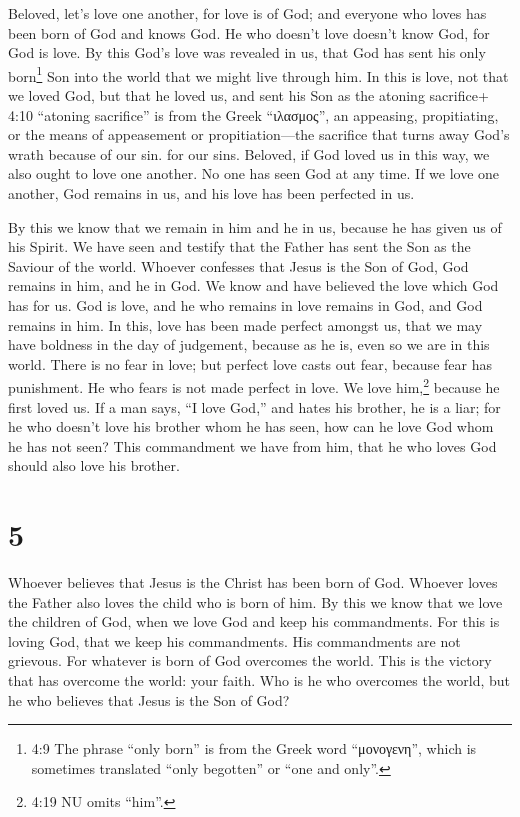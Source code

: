  Beloved, let's love one another, for love is of God; and
everyone who loves has been born of God and knows God.  He
who doesn't love doesn't know God, for God is love.  By this
God's love was revealed in us, that God has sent his only
born\footnote{4:9 The phrase ``only born'' is from the Greek word
  ``μονογενη'', which is sometimes translated ``only begotten'' or ``one
  and only''.} Son into the world that we might live through him.
 In this is love, not that we loved God, but that he loved
us, and sent his Son as the atoning sacrifice+ 4:10 ``atoning
sacrifice'' is from the Greek ``ιλασμος'', an appeasing, propitiating,
or the means of appeasement or propitiation---the sacrifice that turns
away God's wrath because of our sin. for our sins. 
Beloved, if God loved us in this way, we also ought to love one another.
 No one has seen God at any time. If we love one another,
God remains in us, and his love has been perfected in us.

 By this we know that we remain in him and he in us,
because he has given us of his Spirit.  We have seen and
testify that the Father has sent the Son as the Saviour of the world.
 Whoever confesses that Jesus is the Son of God, God
remains in him, and he in God.  We know and have believed
the love which God has for us. God is love, and he who remains in love
remains in God, and God remains in him.  In this, love has
been made perfect amongst us, that we may have boldness in the day of
judgement, because as he is, even so we are in this world. 
There is no fear in love; but perfect love casts out fear, because fear
has punishment. He who fears is not made perfect in love. 
We love him,\footnote{4:19 NU omits ``him''.} because he first loved us.
 If a man says, ``I love God,'' and hates his brother, he
is a liar; for he who doesn't love his brother whom he has seen, how can
he love God whom he has not seen?  This commandment we have
from him, that he who loves God should also love his brother.

\hypertarget{section-4}{%
\section{5}\label{section-4}}

 Whoever believes that Jesus is the Christ has been born of
God. Whoever loves the Father also loves the child who is born of him.
 By this we know that we love the children of God, when we
love God and keep his commandments.  For this is loving God,
that we keep his commandments. His commandments are not grievous.
 For whatever is born of God overcomes the world. This is
the victory that has overcome the world: your faith.  Who is
he who overcomes the world, but he who believes that Jesus is the Son of
God?

